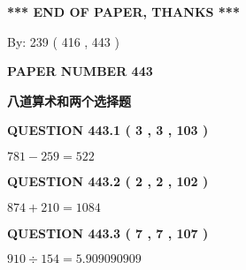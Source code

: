 \documentclass{ctexart}
\begin{document}
 
   
   
 \vspace{0.2in}
 
   
   
   
   
\vspace{1.0in} 
{\textbf{\large{ *** END OF PAPER, THANKS *** }}} 
   
   
\hspace{1.0in} By: 
 239 ( 416 ,  443 )
   
   
   
   
\newpage 
\setcounter{page}{ 
   443001 } 
   
   
   
   
 {\textbf{ \Large{ PAPER NUMBER  443  }}}
   
   
\vspace{0.2in}
   
   
   
   
   
   
 \vspace{0.2in}
{\LARGE {\textbf{ 八道算术和两个选择题}}}
   
   
  
\vspace{0.2in}
  
{\textbf{\Large{QUESTION
443.1 
 ( 3 , 3 , 103 )
}}}
  
  
 
 

$ %
781 -  %
259=   %
522$
 
 
  
\vspace{0.2in}
  
{\textbf{\Large{QUESTION
443.2 
 ( 2 , 2 , 102 )
}}}
  
  
 
 

$ %
874 +  %
210=   %
1084$
 
 
  
\vspace{0.2in}
  
{\textbf{\Large{QUESTION
443.3 
 ( 7 , 7 , 107 )
}}}
  
  
 
 

$ %
910 \div  %
154=   %
5.909090909$
 
 
  
\vspace{0.2in}
  
\end{document}
